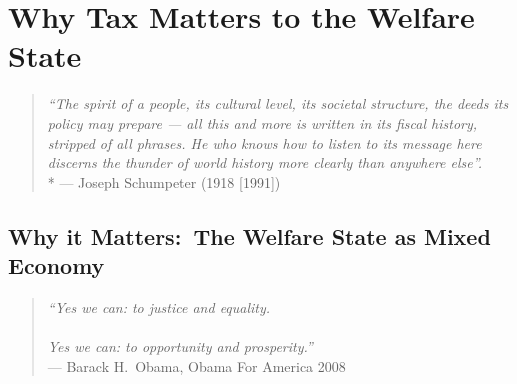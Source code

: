 
\chapter[Tax Matters]{Why Tax Matters to the Welfare State} \label{chap:tax-matters}

\begin{quote}
	\emph{``The spirit of a people, its cultural level, its societal structure, the deeds its policy may prepare --- all this and more is written in its fiscal history, stripped of all phrases.
He who knows how to listen to its message here discerns the thunder of world history more clearly than anywhere else''.}\\*
	--- Joseph Schumpeter (1918 [1991])
\end{quote}




\section{Why it Matters:\ The Welfare State as Mixed Economy} \label{sec:why-mixed-economy-matters}

\begin{quote}
	\emph{``Yes we can:
	to justice and equality.\\ \\
	Yes we can:
	to opportunity and prosperity.''\\}
	--- Barack H.\ Obama, Obama For America 2008
\end{quote} %



